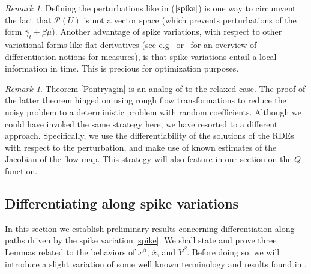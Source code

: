 \documentclass[12pt,reqno]{amsart}
\numberwithin{equation}{section}  %
\newcommand{\1}{{\bf 1}}
\newcommand{\2}{{\bf 2}}
\theoremstyle{remark}
\newtheorem{remark}[theorem]{Remark}
\theoremstyle{remark}
\begin{document}
           \begin{remark}
               Defining the perturbations like in ($\ref{spike}$) is one way to circumvent the fact that $\mathcal{P}(U)$ is not a vector space (which prevents perturbations of the form $\overline{\gamma}_{t}+\beta \mu$). Another advantage of spike variations, with respect to other variational forms like flat derivatives (see e.g~\cite[Appendix]{LMS} or~\cite[Chapter 5]{CDL} for an overview of differentiation notions for measures), is that spike variations entail a local information in time. This is precious for optimization purposes.
               \end{remark}
               \begin{remark}
                   Theorem \ref{Pontryagin} is an analog of \cite[Theorem~7]{diehl} to the relaxed case. The proof of the latter theorem hinged on using rough flow transformations to reduce the noisy problem to a deterministic problem with random coefficients. Although we could have invoked the same strategy here, we have resorted to a different approach. Specifically, we use the differentiability of the solutions of the RDEs with respect to the perturbation, and make use of known estimates of the Jacobian of the flow map. This strategy will also feature in our section on the $Q$-function. 
               \end{remark}


\subsection{Differentiating along spike variations}\label{sec: Prelim}

In this section we establish preliminary results concerning differentiation along paths driven by the spike variation \eqref{spike}.
We shall state and prove three Lemmas related to the behaviors of $x^{\beta}$, $\overline{x}$, and $Y^{\beta}$. Before doing so, we will introduce a slight variation of some well known terminology and results found in \cite[Chapter 11 and Chapter 13]{friz-victoir}.
\end{document}
